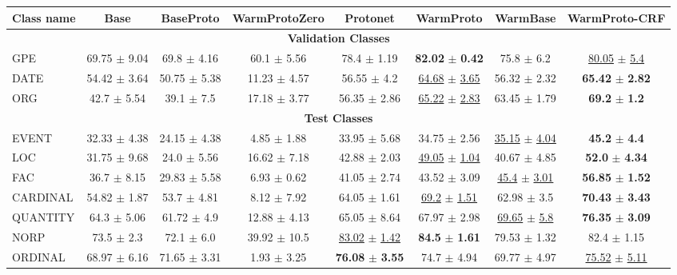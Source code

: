 \begin{table*}[t!]
\begin{center}
\begin{tabular}{|l|ccccccc|}
\hline \bf Class name & \bf Base & \bf BaseProto  & \bf WarmProtoZero & \bf Protonet & \bf WarmProto  & \bf WarmBase & \bf WarmProto-CRF\\
\hline
 \multicolumn{8}{|c|}{\textbf{Validation Classes}} \\
\hline
GPE & 69.75 $\pm$ 9.04 & 69.8 $\pm$ 4.16 & 60.1 $\pm$ 5.56 & 78.4 $\pm$ 1.19 & \textbf{82.02} $\pm$ \textbf{0.42} & 75.8 $\pm$ 6.2 & \underline{80.05} $\pm$ \underline{5.4} \\
DATE & 54.42 $\pm$ 3.64 & 50.75 $\pm$ 5.38 & 11.23 $\pm$ 4.57 & 56.55 $\pm$ 4.2 & \underline{64.68} $\pm$ \underline{3.65} & 56.32 $\pm$ 2.32 & \textbf{65.42} $\pm$ \textbf{2.82} \\
ORG & 42.7 $\pm$ 5.54 & 39.1 $\pm$ 7.5 & 17.18 $\pm$ 3.77 & 56.35 $\pm$ 2.86 & \underline{65.22} $\pm$ \underline{2.83} & 63.45 $\pm$ 1.79 & \textbf{69.2} $\pm$ \textbf{1.2} \\
\hline
 \multicolumn{8}{|c|}{\textbf{Test Classes}} \\
\hline
EVENT & 32.33 $\pm$ 4.38 & 24.15 $\pm$ 4.38 & 4.85 $\pm$ 1.88 & 33.95 $\pm$ 5.68 & 34.75 $\pm$ 2.56 & \underline{35.15} $\pm$ \underline{4.04} & \textbf{45.2} $\pm$ \textbf{4.4} \\
LOC & 31.75 $\pm$ 9.68 & 24.0 $\pm$ 5.56 & 16.62 $\pm$ 7.18 & 42.88 $\pm$ 2.03 & \underline{49.05} $\pm$ \underline{1.04} & 40.67 $\pm$ 4.85 & \textbf{52.0} $\pm$ \textbf{4.34} \\
FAC & 36.7 $\pm$ 8.15 & 29.83 $\pm$ 5.58 & 6.93 $\pm$ 0.62 & 41.05 $\pm$ 2.74 & 43.52 $\pm$ 3.09 & \underline{45.4} $\pm$ \underline{3.01} & \textbf{56.85} $\pm$ \textbf{1.52} \\
CARDINAL & 54.82 $\pm$ 1.87 & 53.7 $\pm$ 4.81 & 8.12 $\pm$ 7.92 & 64.05 $\pm$ 1.61 & \underline{69.2} $\pm$ \underline{1.51} & 62.98 $\pm$ 3.5 & \textbf{70.43} $\pm$ \textbf{3.43} \\
QUANTITY & 64.3 $\pm$ 5.06 & 61.72 $\pm$ 4.9 & 12.88 $\pm$ 4.13 & 65.05 $\pm$ 8.64 & 67.97 $\pm$ 2.98 & \underline{69.65} $\pm$ \underline{5.8} & \textbf{76.35} $\pm$ \textbf{3.09} \\
NORP & 73.5 $\pm$ 2.3 & 72.1 $\pm$ 6.0 & 39.92 $\pm$ 10.5 & \underline{83.02} $\pm$ \underline{1.42} & \textbf{84.5} $\pm$ \textbf{1.61} & 79.53 $\pm$ 1.32 & 82.4 $\pm$ 1.15 \\
ORDINAL & 68.97 $\pm$ 6.16 & 71.65 $\pm$ 3.31 & 1.93 $\pm$ 3.25 & \textbf{76.08} $\pm$ \textbf{3.55} & 74.7 $\pm$ 4.94 & 69.77 $\pm$ 4.97 & \underline{75.52} $\pm$ \underline{5.11} \\

\end{tabular}
\end{center}
\end{table*}
